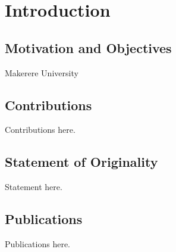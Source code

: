 
\chapter{Introduction}

\section{Motivation and Objectives}

Makerere University



\section{Contributions}

Contributions here.


\section{Statement of Originality}

Statement here.


\section{Publications}

Publications here.
